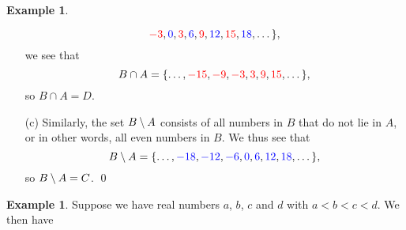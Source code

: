 \documentclass[a4paper]{book}
\theoremstyle{definition}
\newtheorem{example}[theorem]{Example}
\begin{document}
\begin{example}
\begin{itemize}
\[            {\color{red}-3},{\color{blue}0},{\color{red}3},{\color{blue}6},{\color{red}9},{\color{blue}12},
            {\color{red}15},{\color{blue}18},\dotsc\},
   \]
   we see that 
   \[ B\cap A = \{ \dotsc,{\color{red}-15},{\color{red}-9},{\color{red}-3},
                   {\color{red}3},{\color{red}9},{\color{red}15},\dotsc \},
   \]
   so $B\cap A=D$.
  \item[(c)] Similarly, the set $B\setminus A$ consists of all numbers in
   $B$ that do not lie in $A$, or in other words, all even numbers in
   $B$.  We thus see that
   \[ B\setminus A = \{ \dotsc,{\color{blue}-18},{\color{blue}-12},{\color{blue}-6},{\color{blue}0},
                   {\color{blue}6},{\color{blue}12},{\color{blue}18},\dotsc \},
   \]
   so $B\setminus A=C$. \qed
 \end{itemize}
\end{example}

\begin{example}
 Suppose we have real numbers $a$, $b$, $c$ and $d$ with $a<b<c<d$.
 We then have
 \def\X{3.6}  \def\A{0.5}\def\B{1.5}\def\C{2.1}\def\D{3.3} \def\Y{0}
  \newcommand{\newset}[2]{%
   \def\Y{-#1}%
   \drawcolor{black}
   \dotted\lines{(0,\Y),(\X,\Y)}%
   \drawcolor{red} \pen{2pt}
   \tlabel[cl](4.2,\Y){$\scriptstyle #2$}}
  \newcommand{\pp}[1]{\point[3pt]{(#1,\Y)}}
  \newcommand{\oo}[2]{\lines{(#1+0.09,\Y),(#2-0.09,\Y)}}
  \newcommand{\oc}[2]{\lines{(#1+0.09,\Y),(#2,\Y)}\pp{#2}}
  \newcommand{\co}[2]{\lines{(#1,\Y),(#2-0.09,\Y)}\pp{#1}}
  \newcommand{\cc}[2]{\lines{(#1,\Y),(#2,\Y)}\pp{#1}\pp{#2}}


\end{example}
\end{document}
